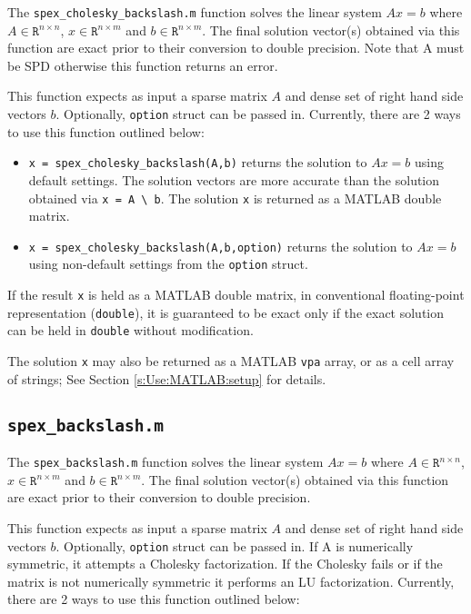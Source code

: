 \documentclass[12pt]{report}
\theoremstyle{definition}
\begin{document}
The \verb|spex_cholesky_backslash.m| function solves the linear system $A x = b$ where
$A \in \mathtt{R}^{n \times n}$, $x \in \mathtt{R}^{n \times m}$ and $b \in
\mathtt{R}^{n \times m}$. The final solution vector(s) obtained via this
function are exact prior to their conversion to double precision. Note that
A must be SPD otherwise this function returns an error.

This function expects as input a sparse matrix $A$ and dense set of
right hand side vectors $b$. Optionally, \verb|option| struct can be passed in.
Currently, there are 2 ways to use this function outlined below:

\begin{itemize}

\item \verb|x = spex_cholesky_backslash(A,b)| returns the solution to $A x =
b$ using default settings. The solution vectors are more accurate than
the solution obtained via \verb|x = A \ b|.  The solution \verb|x| is
returned as a MATLAB double matrix.

\item \verb|x = spex_cholesky_backslash(A,b,option)| returns the solution to $A x =
b$ using non-default settings from the \verb|option| struct.

\end{itemize}

If the result \verb|x| is held as a MATLAB double matrix, in conventional
floating-point representation (\verb|double|), it is guaranteed to be exact
only if the exact solution can be held in \verb|double| without modification.

The solution \verb|x| may also be returned as a MATLAB \verb|vpa| array, or as
a cell array of strings; See Section \ref{s:Use:MATLAB:setup} for details.


\subsection{\texttt{spex\_backslash.m}}

The \verb|spex_backslash.m| function solves the linear system $A x = b$ where
$A \in \mathtt{R}^{n \times n}$, $x \in \mathtt{R}^{n \times m}$ and $b \in
\mathtt{R}^{n \times m}$. The final solution vector(s) obtained via this
function are exact prior to their conversion to double precision.

This function expects as input a sparse matrix $A$ and dense set of
right hand side vectors $b$. Optionally, \verb|option| struct can be passed in.
If A is numerically symmetric, it attempts a Cholesky factorization. If the Cholesky
fails or if the matrix is not numerically symmetric it performs an LU factorization.
Currently, there are 2 ways to use this function outlined below:
\end{document}
